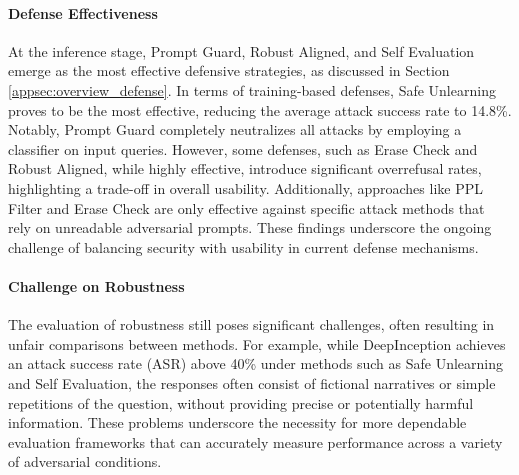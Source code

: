 \paragraph{Defense Effectiveness} 
At the inference stage, Prompt Guard, Robust Aligned, and Self Evaluation emerge as the most effective defensive strategies, as discussed in Section \ref{appsec:overview_defense}. In terms of training-based defenses, Safe Unlearning proves to be the most effective, reducing the average attack success rate to 14.8\%. Notably, Prompt Guard completely neutralizes all attacks by employing a classifier on input queries.
However, some defenses, such as Erase Check and Robust Aligned, while highly effective, introduce significant overrefusal rates, highlighting a trade-off in overall usability. Additionally, approaches like PPL Filter and Erase Check are only effective against specific attack methods that rely on unreadable adversarial prompts. These findings underscore the ongoing challenge of balancing security with usability in current defense mechanisms.

\paragraph{Challenge on Robustness} 
The evaluation of robustness still poses significant challenges, often resulting in unfair comparisons between methods. For example, while DeepInception achieves an attack success rate (ASR) above 40\% under methods such as Safe Unlearning and Self Evaluation, the responses often consist of fictional narratives or simple repetitions of the question, without providing precise or potentially harmful information. These problems underscore the necessity for more dependable evaluation frameworks that can accurately measure performance across a variety of adversarial conditions.

